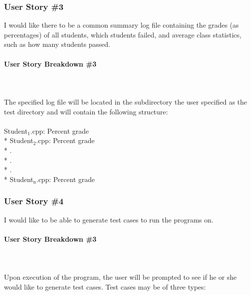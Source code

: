 \documentclass {article}
\begin{document}
					\raggedright
						
						
	 		\subsubsection{\large{\color{cyan}User Story \#3}}
	 			I would like there to be a common summary log file containing the grades
	 			 (as percentages) of all students, which students failed, and average class
	 			 statistics, such as how many students passed.
	 			 
	 			\paragraph{\textbf{User Story Breakdown \#3}}
	 				\ \\ \ \\The specified log file will be located in the subdirectory the user
	 				 specified as the test directory and will contain the following structure:\\ \ 							 \\
	 				
	 				\centering
						\indent	Student$_{\text{1}}$.cpp:	\indent Percent grade \\*
						\indent	Student$_{\text{2}}$.cpp:	\indent Percent grade \\*
						\indent \indent \indent \indent \indent \indent	.				 \\*
						\indent \indent \indent \indent \indent \indent	.				 \\*
						\indent \indent \indent \indent \indent \indent	.				 \\*
						\indent	Student$_{\text{n}}$.cpp:	\indent Percent grade
						
					\raggedright
					
					
	 		\subsubsection{\large{\color{cyan}User Story \#4}}
	 			I would like to be able to generate test cases to run the programs on.
	 			
	 			\paragraph{\textbf{User Story Breakdown \#3}}
	 				\ \\ \ \\Upon execution of the program, the user will be prompted to see if
	 				he or she would like to generate test cases. Test cases may be of three types:
	 				
\end{document}
